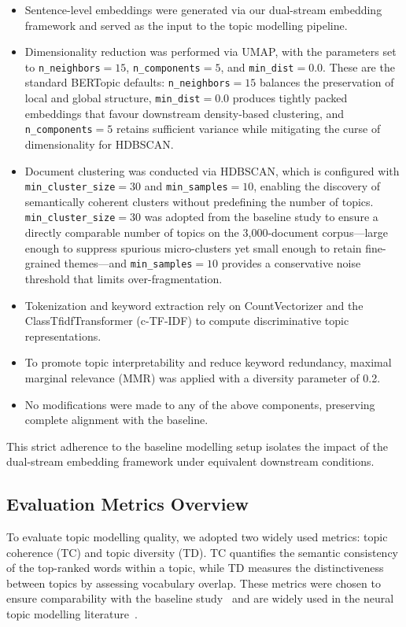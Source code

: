 \documentclass[authorproof,JACIII,researchpaper]{fujipressarticle}
\begin{document}
{\color{red}%
\begin{itemize}[leftmargin=*,itemsep=2pt]
    \item Sentence-level embeddings were generated via our dual-stream embedding framework and served as the input to the topic modelling pipeline.

    \item Dimensionality reduction was performed via UMAP, with the parameters set to \texttt{n\_neighbors}$=15$, \texttt{n\_components}$=5$, and \texttt{min\_dist}$=0.0$. These are the standard BERTopic defaults: \texttt{n\_neighbors}$=15$ balances the preservation of local and global structure, \texttt{min\_dist}$=0.0$ produces tightly packed embeddings that favour downstream density-based clustering, and \texttt{n\_components}$=5$ retains sufficient variance while mitigating the curse of dimensionality for HDBSCAN.

    \item Document clustering was conducted via HDBSCAN, which is configured with \texttt{min\_cluster\_size}$=30$ and \texttt{min\_samples}$=10$, enabling the discovery of semantically coherent clusters without predefining the number of topics. \texttt{min\_cluster\_size}$=30$ was adopted from the baseline study to ensure a directly comparable number of topics on the 3{,}000-document corpus---large enough to suppress spurious micro-clusters yet small enough to retain fine-grained themes---and \texttt{min\_samples}$=10$ provides a conservative noise threshold that limits over-fragmentation.

    \item Tokenization and keyword extraction rely on CountVectorizer and the ClassTfidfTransformer (c-TF-IDF) to compute discriminative topic representations.

    \item To promote topic interpretability and reduce keyword redundancy, maximal marginal relevance (MMR) was applied with a diversity parameter of 0.2.

    \item No modifications were made to any of the above components, preserving complete alignment with the baseline.
\end{itemize}
}%

This strict adherence to the baseline modelling setup isolates the impact of the dual-stream embedding framework under equivalent downstream conditions.

\subsection{Evaluation Metrics Overview}
To evaluate topic modelling quality, we adopted two widely used metrics: topic coherence (TC) and topic diversity (TD). TC quantifies the semantic consistency of the top-ranked words within a topic, while TD measures the distinctiveness between topics by assessing vocabulary overlap. These metrics were chosen to ensure comparability with the baseline study~\cite{lezhnina_depression_2023} and are widely used in the neural topic modelling literature~\cite{dieng_topic_2020,mimno_optimizing_2011,roder_exploring_2015}.
\end{document}
